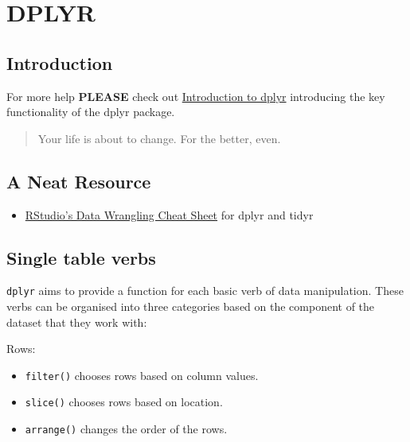 \documentclass[
]{book}
\providecommand{\tightlist}{%
  \setlength{\itemsep}{0pt}\setlength{\parskip}{0pt}}
\begin{document}
\hypertarget{dplyr}{%
\chapter{DPLYR}\label{dplyr}}

\hypertarget{introduction-3}{%
\section{Introduction}\label{introduction-3}}

For more help \textbf{PLEASE} check out \href{https://dplyr.tidyverse.org/articles/dplyr.html}{Introduction to dplyr} introducing the key functionality of the dplyr package.

\begin{quote}
Your life is about to change. For the better, even.
\end{quote}

\hypertarget{a-neat-resource}{%
\section{A Neat Resource}\label{a-neat-resource}}

\begin{itemize}
\tightlist
\item
  \href{http://www.rstudio.com/wp-content/uploads/2015/02/data-wrangling-cheatsheet.pdf}{RStudio's Data Wrangling Cheat Sheet} for dplyr and tidyr
\end{itemize}

\hypertarget{single-table-verbs}{%
\section{Single table verbs}\label{single-table-verbs}}

\texttt{dplyr} aims to provide a function for each basic verb of data manipulation. These verbs can be organised into three categories based on the component of the dataset that they work with:

Rows:

\begin{itemize}
\tightlist
\item
  \texttt{filter()} chooses rows based on column values.
\item
  \texttt{slice()} chooses rows based on location.
\item
  \texttt{arrange()} changes the order of the rows.
\end{itemize}
\end{document}
